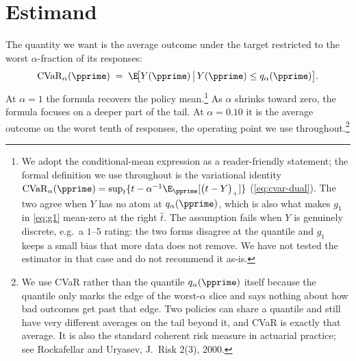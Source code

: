 \documentclass[11pt]{article}
\newcommand{\CVaR}{\mathrm{CVaR}}
\newcommand{\stoploss}[2]{\bigl(#1 - #2\bigr)_{+}}
\begin{document}
\section{Estimand}

The quantity we want is the average outcome under the target restricted to the worst $\alpha$-fraction of its responses:
\begin{equation}\label{eq:cvar-def}
\CVaR_\alpha(\pprime) \;=\; \E\!\big[Y(\pprime) \,\big|\, Y(\pprime) \le q_\alpha(\pprime)\big].
\end{equation}
At $\alpha = 1$ the formula recovers the policy mean.\footnote{We adopt the conditional-mean expression as a reader-friendly statement; the formal definition we use throughout is the variational identity $\CVaR_\alpha(\pprime) = \sup_t\{t - \alpha^{-1}\E_{\pprime}[\stoploss{t}{Y}]\}$ (\cref{eq:cvar-dual}). The two agree when $Y$ has no atom at $q_\alpha(\pprime)$, which is also what makes $g_1$ in \cref{eq:g1} mean-zero at the right $\hat t$. The assumption fails when $Y$ is genuinely discrete, e.g.\ a $1$--$5$ rating: the two forms disagree at the quantile and $g_1$ keeps a small bias that more data does not remove. We have not tested the estimator in that case and do not recommend it as-is.} As $\alpha$ shrinks toward zero, the formula focuses on a deeper part of the tail. At $\alpha = 0.10$ it is the average outcome on the worst tenth of responses, the operating point we use throughout.\footnote{We use CVaR rather than the quantile $q_\alpha(\pprime)$ itself because the quantile only marks the edge of the worst-$\alpha$ slice and says nothing about how bad outcomes get past that edge. Two policies can share a quantile and still have very different averages on the tail beyond it, and CVaR is exactly that average. It is also the standard coherent risk measure in actuarial practice; see Rockafellar and Uryasev, J.\ Risk 2(3), 2000.}
\end{document}
